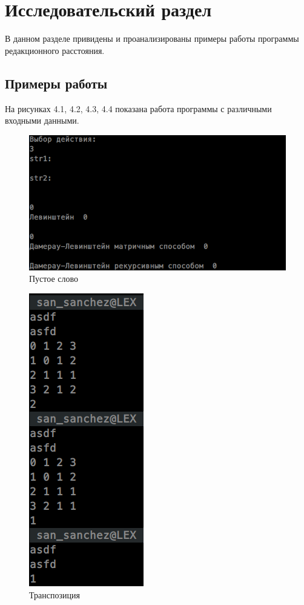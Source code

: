 \chapter{Исследовательский раздел}
\label{cha:research}

В данном разделе привидены и проанализированы примеры работы программы редакционного расстояния.

\section{Примеры работы}

На рисунках 4.1, 4.2, 4.3, 4.4 показана работа программы с различными входными данными.

\begin{figure}[H]
\centering
\includegraphics[scale=0.75]{./pict/5rr.png}
\caption{Пустое слово}
\end{figure}
\begin{figure}[H]
\centering
\includegraphics[scale=0.75]{./pict/work_transpos.png}
\caption{Транспозиция}
\end{figure}
